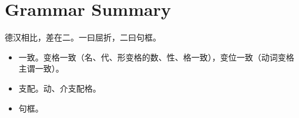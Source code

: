 \chapter{Grammar Summary}

德汉相比，差在二。一曰屈折，二曰句框。

\begin{itemize}
    \item 一致。变格一致（名、代、形变格的数、性、格一致），变位一致（动词变格主谓一致）。
    \item 支配。动、介支配格。
    \item 句框。
\end{itemize}